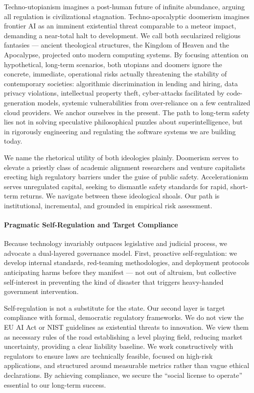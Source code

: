 Techno-utopianism imagines a post-human future of infinite abundance,
arguing all regulation is civilizational stagnation. Techno-apocalyptic
doomerism imagines frontier AI as an imminent existential threat
comparable to a meteor impact, demanding a near-total halt to
development. We call both secularized religious fantasies --- ancient
theological structures, the Kingdom of Heaven and the Apocalypse,
projected onto modern computing systems. By focusing attention on
hypothetical, long-term scenarios, both utopians and doomers ignore the
concrete, immediate, operational risks actually threatening the
stability of contemporary societies: algorithmic discrimination in
lending and hiring, data privacy violations, intellectual property
theft, cyber-attacks facilitated by code-generation models, systemic
vulnerabilities from over-reliance on a few centralized cloud providers.
We anchor ourselves in the present. The path to long-term safety lies
not in solving speculative philosophical puzzles about
superintelligence, but in rigorously engineering and regulating the
software systems we are building today.

We name the rhetorical utility of both ideologies plainly. Doomerism
serves to elevate a priestly class of academic alignment researchers and
venture capitalists erecting high regulatory barriers under the guise of
public safety. Accelerationism serves unregulated capital, seeking to
dismantle safety standards for rapid, short-term returns. We navigate
between these ideological shoals. Our path is institutional,
incremental, and grounded in empirical risk assessment.

\paragraph{Pragmatic Self-Regulation and Target
Compliance}\label{pragmatic-self-regulation-and-target-compliance}

Because technology invariably outpaces legislative and judicial process,
we advocate a dual-layered governance model. First, proactive
self-regulation: we develop internal standards, red-teaming
methodologies, and deployment protocols anticipating harms before they
manifest --- not out of altruism, but collective self-interest in
preventing the kind of disaster that triggers heavy-handed government
intervention.

Self-regulation is not a substitute for the state. Our second layer is
target compliance with formal, democratic regulatory frameworks. We do
not view the EU AI Act or NIST guidelines as existential threats to
innovation. We view them as necessary rules of the road establishing a
level playing field, reducing market uncertainty, providing a clear
liability baseline. We work constructively with regulators to ensure
laws are technically feasible, focused on high-risk applications, and
structured around measurable metrics rather than vague ethical
declarations. By achieving compliance, we secure the ``social license to
operate'' essential to our long-term success.

